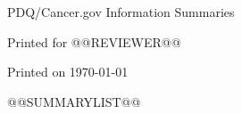 \documentclass[letterpaper,12pt]{letter}
\begin{document}
\thispagestyle{empty}

PDQ\textregistered/Cancer.gov Information Summaries

\vspace{6pt}

Printed for @@REVIEWER@@

\vspace{6pt}

Printed on \today \\

\begin{itemize}
@@SUMMARYLIST@@
\end{itemize}
\vfill
\end{document}
